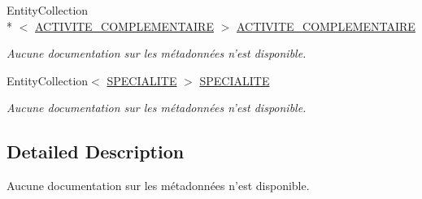 \begin{DoxyCompactItemize}
Entity\-Collection\\*
$<$ \hyperlink{class_model_1_1_a_c_t_i_v_i_t_e___c_o_m_p_l_e_m_e_n_t_a_i_r_e}{A\-C\-T\-I\-V\-I\-T\-E\-\_\-\-C\-O\-M\-P\-L\-E\-M\-E\-N\-T\-A\-I\-R\-E} $>$ \hyperlink{class_model_1_1_p_r_a_t_i_c_i_e_n_af38b58649915c0ec56ae505fe0bec260}{A\-C\-T\-I\-V\-I\-T\-E\-\_\-\-C\-O\-M\-P\-L\-E\-M\-E\-N\-T\-A\-I\-R\-E}
\begin{DoxyCompactList}\small\item\em Aucune documentation sur les métadonnées n'est disponible. \end{DoxyCompactList}\item 
Entity\-Collection$<$ \hyperlink{class_model_1_1_s_p_e_c_i_a_l_i_t_e}{S\-P\-E\-C\-I\-A\-L\-I\-T\-E} $>$ \hyperlink{class_model_1_1_p_r_a_t_i_c_i_e_n_a15a32a4f8d3a3abc5d4644d2c9b5d29e}{S\-P\-E\-C\-I\-A\-L\-I\-T\-E}
\begin{DoxyCompactList}\small\item\em Aucune documentation sur les métadonnées n'est disponible. \end{DoxyCompactList}\end{DoxyCompactItemize}


\subsection{Detailed Description}
Aucune documentation sur les métadonnées n'est disponible. 



